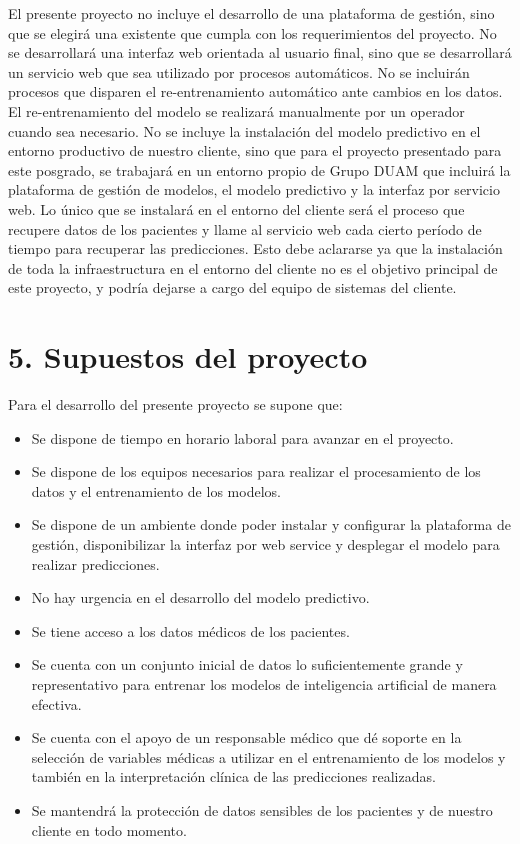 \documentclass[
11pt, %
]{charter}
\begin{document}
El presente proyecto no incluye el desarrollo de una plataforma de gestión, sino que se elegirá una existente que cumpla con los requerimientos del proyecto. No se desarrollará una interfaz web orientada al usuario final, sino que se desarrollará un servicio web que sea utilizado por procesos automáticos. No se incluirán procesos que disparen el re-entrenamiento automático ante cambios en los datos. El re-entrenamiento del modelo se realizará manualmente por un operador cuando sea necesario.
No se incluye la instalación del modelo predictivo en el entorno productivo de nuestro cliente, sino que para el proyecto presentado para este posgrado, se trabajará en un entorno propio de Grupo DUAM que incluirá la plataforma de gestión de modelos, el modelo predictivo y la interfaz por servicio web. Lo único que se instalará en el entorno del cliente será el proceso que recupere datos de los pacientes y llame al servicio web cada cierto período de tiempo para recuperar las predicciones. Esto debe aclararse ya que la instalación de toda la infraestructura en el entorno del cliente no es el objetivo principal de este proyecto, y podría dejarse a cargo del equipo de sistemas del cliente.

\section{5. Supuestos del proyecto}
\label{sec:supuestos}

Para el desarrollo del presente proyecto se supone que:

\begin{itemize}
	\item Se dispone de tiempo en horario laboral para avanzar en el proyecto.
	\item Se dispone de los equipos necesarios para realizar el procesamiento de los datos y el entrenamiento de los modelos.
	\item Se dispone de un ambiente donde poder instalar y configurar la plataforma de gestión, disponibilizar la interfaz por web service y desplegar el modelo para realizar predicciones. 
	\item No hay urgencia en el desarrollo del modelo predictivo.		
	\item Se tiene acceso a los datos médicos de los pacientes.
	\item Se cuenta con un conjunto inicial de datos lo suficientemente grande y representativo para entrenar los modelos de inteligencia artificial de manera efectiva.
	\item Se cuenta con el apoyo de un responsable médico que dé soporte en la selección de variables médicas a utilizar en el entrenamiento de los modelos y también en la interpretación clínica de las predicciones realizadas.
	\item Se mantendrá la protección de datos sensibles de los pacientes y de nuestro cliente en todo momento.		
\end{itemize}
\end{document}
